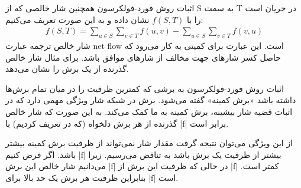 \begin{itemframe}{اثبات روش فورد-فولکرسون}
\itm
همچنین شار خالصی
 که از S به سمت T در جریان است را با
$f(S, T)$
نشان داده و به این صورت تعریف می‌کنیم:
\begin{align}
f(S, T) = \sum_{u \in S}  \sum_{v \in T} f(u, v)  - \sum_{u \in S}  \sum_{v \in T} f(v, u)
\label{cut-net-flow}
\end{align}
\itm
شار خالص ترجمه عبارت net flow است. این عبارت برای کمیتی به کار می‌رود که حاصل کسر شارهای جهت مخالف از شارهای موافق باشد. برای مثال  شار خالص گذرنده از یک برش را نشان می‌دهد.
\end{itemframe}

\begin{itemframe}{اثبات روش فورد-فولکرسون}
\itm
به برشی که کمترین ظرفیت را در میان تمام برش‌ها داشته باشد «برش کمینه»
 گفته می‌شود.
\itm
برش در شبکه شار ویژگی مهمی دارد که در اثبات قضیه شار بیشینه، برش کمینه به ما کمک می‌کند. به این صورت که شار خالص گذرنده از هر برش دلخواه (که در  تعریف کردیم) با |f| برابر است.

\itm
از این ویژگی می‌توان نتیجه گرفت مقدار شار نمی‌تواند از ظرفیت برش کمینه بیشتر باشد. اگر فرض کنیم |f| بیشتر از ظرفیت یک برش باشد به تناقض می‌رسیم. زیرا می‌دانیم شار خالص این برش |f| در  حالی که ظرفیت این برش از |f| کمتر است.
\itm
بنابراین ظرفیت هر برش یک حد بالا برای |f| است.
\end{itemframe}

